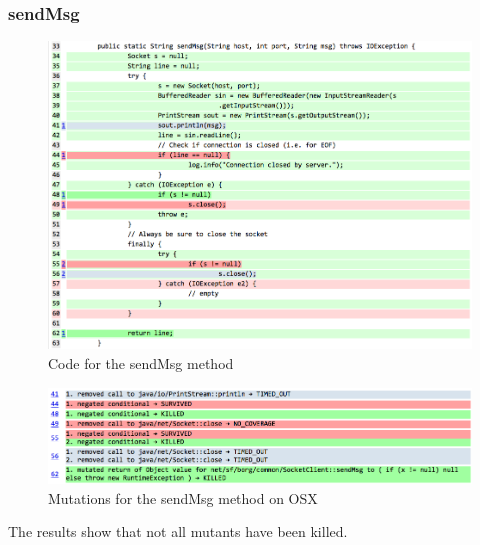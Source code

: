 \documentclass[fontsize=12pt,paper=letter,twoside]{scrartcl}
\begin{document}
\subsubsection{sendMsg}
\begin{figure}[H]
\begin{center}
\includegraphics[width=.99\textwidth]{images/MutationTesting/sendMsgCode.png}
\end{center}
\caption{Code for the sendMsg method}
\label{fig:sendMsgCode}
\end{figure}

\begin{figure}[H]
\begin{center}
\includegraphics[width=.99\textwidth]{images/MutationTesting/sendMsgMutant.png}
\end{center}
\caption{Mutations for the sendMsg method on OSX}
\label{fig:sendMsgMutant}
\end{figure}

The results show that not all mutants have been killed.
\end{document}
